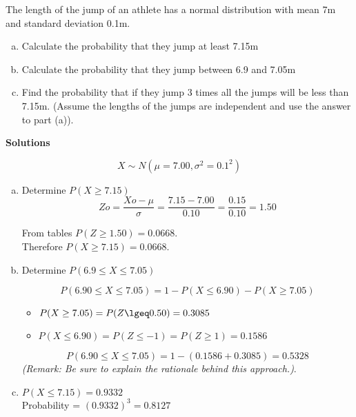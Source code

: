 
\noindent The length of the jump of an athlete has a normal distribution with mean 7m and standard deviation 0.1m. 



\begin{enumerate}[(a)]
	\item 
	Calculate the probability that they jump  at least 7.15m
	
\item 
	Calculate the probability that they jump  between 6.9 and 7.05m
	
\item 
	Find the probability that if they jump  3 times all the jumps will be less than 7.15m. (Assume the lengths of the jumps are independent and use the answer to part (a)).  
	
\end{enumerate}

\noindent \textbf{Solutions}

\[ X \sim N(\mu = 7.00,  \sigma^2 = 0.1^2 )\]


\begin{enumerate}[(a)]
    \item Determine $P(X \geq 7.15) $               
\[Zo=\frac{Xo-\mu}{\sigma} = \frac{7.15 - 7.00}{0.10}=\frac{0.15}{0.10}=1.50\]

From tables $P(Z\geq 1.50) = 0.0668$. \\    \smallskip     
Therefore $P(X\geq 7.15) = 0.0668$.

\bigskip
\item Determine $P(6.9\leq X \leq 7.05)$


\[P(6.90 \leq X \leq 7.05) = 1 - P(X\leq 6.90 ) - P(X \geq 7.05 )\]
\medskip
\begin{itemize}
\item $P(X\geq 7.05 ) = P(Z \lgeq 0.50 ) = 0.3085 $  
\smallskip
\item $P(X\leq 6.90 ) = P(Z \leq -1 )= P(Z \geq 1 ) = 0.1586$
\end{itemize}
\medskip
\[P(6.90 \leq X \leq 7.05) = 1 - (0.1586 + 0.3085) = 0.5328\]      
\noindent \textit{(Remark: Be sure to explain the rationale behind this approach.)}.
\item             
$P(X\leq 7.15) = 0.9332$\\        \medskip
Probability = $(0.9332)^3= 0.8127$

\end{enumerate}



